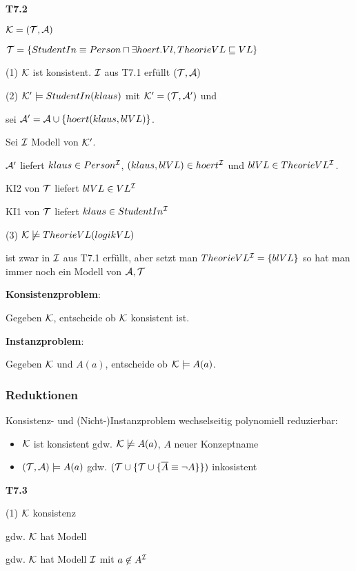 \textbf{T7.2}

$\mathcal{K} = (\mathcal{T}, \mathcal{A})$

$\mathcal{T} = \{StudentIn \equiv Person \sqcap \exists hoert.Vl, TheorieVL \sqsubseteq VL\}$

(1) $\mathcal{K}$ ist konsistent. $\mathcal{I}$ aus T7.1 erfüllt $(\mathcal{T},\mathcal{A})$

(2) $\mathcal{K}' \models StudentIn(klaus)$ mit $\mathcal{K}' = (\mathcal{T}, \mathcal{A}')$ und 

sei $\mathcal{A}' = \mathcal{A} \cup \{hoert(klaus,blVL)\}$.

Sei $\mathcal{I}$ Modell von $\mathcal{K}'$. 

$\mathcal{A}'$ liefert $klaus \in Person^{\mathcal{I}}$, $(klaus,blVL) \in hoert^{\mathcal{I}}$ und $blVL \in TheorieVL^{\mathcal{I}}$.

KI2 von $\mathcal{T}$ liefert $blVL \in VL^{\mathcal{I}}$

KI1 von $\mathcal{T}$ liefert $klaus \in StudentIn^{\mathcal{I}}$

(3) $\mathcal{K} \not\models TheorieVL(logikVL)$

    ist zwar in $\mathcal{I}$ aus T7.1 erfüllt, aber setzt man $TheorieVL^{\mathcal{I}} = \{blVL \}$ so hat man immer noch ein Modell von $\mathcal{A},\mathcal{T}$ 

\textbf{Konsistenzproblem}:

Gegeben $\mathcal{K}$, entscheide ob $\mathcal{K}$ konsistent ist.

\textbf{Instanzproblem}:

Gegeben $\mathcal{K}$ und $A(a)$, entscheide ob $\mathcal{K} \models A(a)$.

\subsubsection{Reduktionen}

Konsistenz- und (Nicht-)Instanzproblem wechselseitig polynomiell reduzierbar:

\begin{lemma} 

\begin{itemize}
	\item $\mathcal{K}$ ist konsistent gdw. $\mathcal{K} \not\models A(a)$, $A$ neuer Konzeptname
	\item $(\mathcal{T}, \mathcal{A}) \models A(a)$ gdw. $(\mathcal{T} \cup \{\mathcal{T} \cup \{\overline{A} \equiv \neg A\}\})$ inkosistent
\end{itemize}
\end{lemma}

\textbf{T7.3}

(1) $\mathcal{K}$ konsistenz

gdw. $\mathcal{K}$ hat Modell

gdw. $\mathcal{K}$ hat Modell $\mathcal{I}$ mit $a \not\in A^{\mathcal{I}}$

